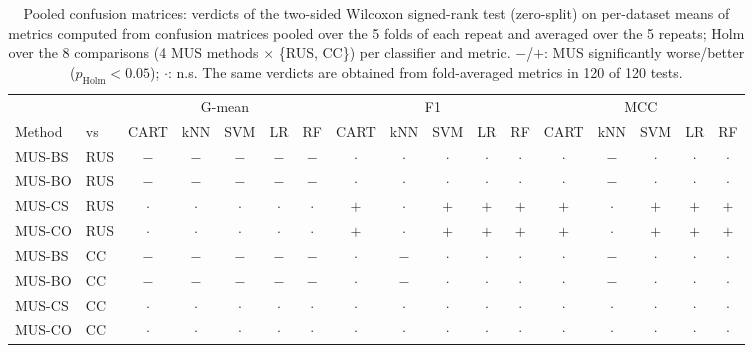 \begin{table}[!htbp]
\centering
\caption{Pooled confusion matrices: verdicts of the two-sided Wilcoxon signed-rank test (zero-split) on per-dataset means of metrics computed from confusion matrices pooled over the 5 folds of each repeat and averaged over the 5 repeats; Holm over the 8 comparisons (4 MUS methods $\times$ \{RUS, CC\}) per classifier and metric. $-$/$+$: MUS significantly worse/better ($p_\mathrm{Holm}<0.05$); $\cdot$: n.s. The same verdicts are obtained from fold-averaged metrics in 120 of 120 tests.}
\label{tab:a2_pooled}
\scriptsize
\setlength{\tabcolsep}{2.5pt}
\begin{tabular}{llccccccccccccccc}
\toprule
 & & \multicolumn{5}{c}{G-mean} & \multicolumn{5}{c}{F1} & \multicolumn{5}{c}{MCC} \\
\cmidrule(lr){3-7}\cmidrule(lr){8-12}\cmidrule(lr){13-17}
Method & vs & CART & kNN & SVM & LR & RF & CART & kNN & SVM & LR & RF & CART & kNN & SVM & LR & RF \\
\midrule
MUS-BS & RUS & $-$ & $-$ & $-$ & $-$ & $-$ & $\cdot$ & $\cdot$ & $\cdot$ & $\cdot$ & $\cdot$ & $\cdot$ & $-$ & $\cdot$ & $\cdot$ & $\cdot$ \\
MUS-BO & RUS & $-$ & $-$ & $-$ & $-$ & $-$ & $\cdot$ & $\cdot$ & $\cdot$ & $\cdot$ & $\cdot$ & $\cdot$ & $-$ & $\cdot$ & $\cdot$ & $\cdot$ \\
MUS-CS & RUS & $\cdot$ & $\cdot$ & $\cdot$ & $\cdot$ & $\cdot$ & $+$ & $\cdot$ & $+$ & $+$ & $+$ & $+$ & $\cdot$ & $+$ & $+$ & $+$ \\
MUS-CO & RUS & $\cdot$ & $\cdot$ & $\cdot$ & $\cdot$ & $\cdot$ & $+$ & $\cdot$ & $+$ & $+$ & $+$ & $+$ & $\cdot$ & $+$ & $+$ & $+$ \\
\midrule
MUS-BS & CC & $-$ & $-$ & $-$ & $-$ & $-$ & $\cdot$ & $-$ & $\cdot$ & $\cdot$ & $\cdot$ & $\cdot$ & $-$ & $\cdot$ & $\cdot$ & $\cdot$ \\
MUS-BO & CC & $-$ & $-$ & $-$ & $-$ & $-$ & $\cdot$ & $-$ & $\cdot$ & $\cdot$ & $\cdot$ & $\cdot$ & $-$ & $\cdot$ & $\cdot$ & $\cdot$ \\
MUS-CS & CC & $\cdot$ & $\cdot$ & $\cdot$ & $\cdot$ & $\cdot$ & $\cdot$ & $\cdot$ & $\cdot$ & $\cdot$ & $\cdot$ & $\cdot$ & $\cdot$ & $\cdot$ & $\cdot$ & $\cdot$ \\
MUS-CO & CC & $\cdot$ & $\cdot$ & $\cdot$ & $\cdot$ & $\cdot$ & $\cdot$ & $\cdot$ & $\cdot$ & $\cdot$ & $\cdot$ & $\cdot$ & $\cdot$ & $\cdot$ & $\cdot$ & $\cdot$ \\
\bottomrule
\end{tabular}
\end{table}
